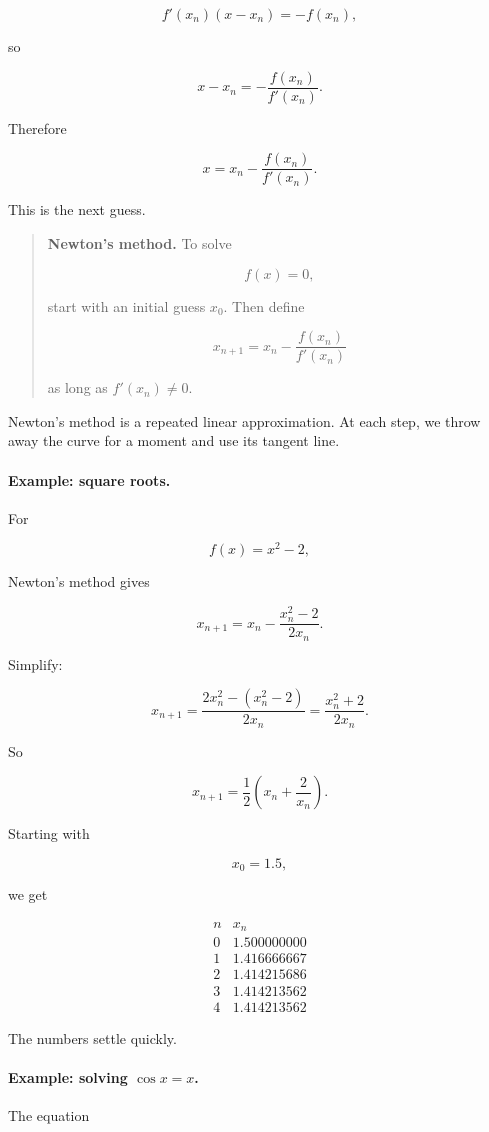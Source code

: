 \[
f'(x_n)(x-x_n)=-f(x_n),
\]

so

\[
x-x_n=-\frac{f(x_n)}{f'(x_n)}.
\]

Therefore

\[
x=x_n-\frac{f(x_n)}{f'(x_n)}.
\]

This is the next guess.

\begin{quote}
\textbf{Newton's method.}
To solve

\[
f(x)=0,
\]

start with an initial guess \(x_0\).  Then define

\[
\boxed{
x_{n+1}
=
x_n-\frac{f(x_n)}{f'(x_n)}
}
\]

as long as \(f'(x_n)\neq0\).
\end{quote}

Newton's method is a repeated linear approximation.  At each step, we throw away
the curve for a moment and use its tangent line.

\paragraph{Example: square roots.}
For

\[
f(x)=x^2-2,
\]

Newton's method gives

\[
x_{n+1}
=
x_n-\frac{x_n^2-2}{2x_n}.
\]

Simplify:

\[
x_{n+1}
=
\frac{2x_n^2-(x_n^2-2)}{2x_n}
=
\frac{x_n^2+2}{2x_n}.
\]

So

\[
\boxed{
x_{n+1}
=
\frac12\left(x_n+\frac{2}{x_n}\right).
}
\]

Starting with

\[
x_0=1.5,
\]

we get

\[
\begin{array}{c|c}
n & x_n \\ \hline
0 & 1.500000000\\
1 & 1.416666667\\
2 & 1.414215686\\
3 & 1.414213562\\
4 & 1.414213562
\end{array}
\]

The numbers settle quickly.

\paragraph{Example: solving \(\cos x=x\).}
The equation

